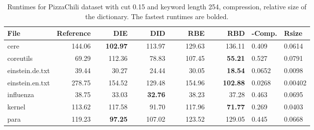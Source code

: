 \documentclass[english,twoside,censored,csm,algorithms-track-2020]{HYthesisML}
\theoremstyle{plain}
\theoremstyle{definition}
\begin{document}
\begin{center}
  \begin{table}
  \begin{tabular} {| l |r r r r r|l l|}
    \hline
    \textbf{File} & \textbf{Reference} & ~~~~\textbf{DIE} & ~~~~\textbf{DID} & ~~~~\textbf{RBE} & ~~~~\textbf{RBD} & \textbf{-Comp.} & \textbf{Rsize} \\
    \hline
    cere & 144.06 & \textbf{102.97} & 113.97 & 129.63 & 136.11            & 0.409  & 0.0614  \\
    coreutils & 69.29 & 112.36 & 78.83 & 107.45 & \textbf{55.21}          & 0.527  & 0.0791  \\
    einstein.de.txt & 39.44 & 30.27 & 24.44 & 30.05 & \textbf{18.54}      & 0.0652 & 0.0098  \\
    einstein.en.txt & 278.75 & 154.52 & 129.48 & 154.96 & \textbf{102.88} & 0.0268 & 0.00402 \\
    influenza & 38.75 & 33.03 & \textbf{32.76} & 38.23 & 37.28            & 0.463  & 0.0695  \\
    kernel & 113.62 & 117.58 & 91.70 & 117.96 & \textbf{71.77}            & 0.269  & 0.0403  \\
    para & 119.23 & \textbf{97.25} & 107.02 & 123.52 & 129.05             & 0.445  & 0.0668  \\
    \hline
  \end{tabular}
  \caption{Runtimes for PizzaChili dataset with cut 0.15 and keyword length 254, compression, relative size of the dictionary. The fastest runtimes are bolded.}
  \label{runtimes-15-254}
  \end{table}
\end{center}
\end{document}
